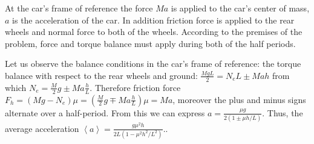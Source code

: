 {\ifEngHint
At the car’s frame of reference the force $Ma$ is applied to the car’s center of mass, $a$ is the acceleration of the car. In addition friction force is applied to the rear wheels and normal force to both of the wheels. According to the premises of the problem, force and torque balance must apply during both of the half periods.
\fi


\ifEngSolution
Let us observe the balance conditions in the car’s frame of reference: the torque balance with respect to the rear wheels and ground: $\frac {MgL}2=N_eL\pm Mah$ from which $N_e=\frac M2g\pm Ma\frac hL$. Therefore friction force $F_h=(Mg-N_e)\mu=(\frac M2g\mp Ma\frac hL)\mu=Ma$, moreover the plus and minus signs alternate over a half-period. From this we can express $a=\frac{\mu g}{2(1\pm \mu h/L)}$. Thus, the average acceleration $\left< a\right>=\frac{g\mu^2h}{2L(1-\mu^2h^2/L^2)}.$.
\fi
}